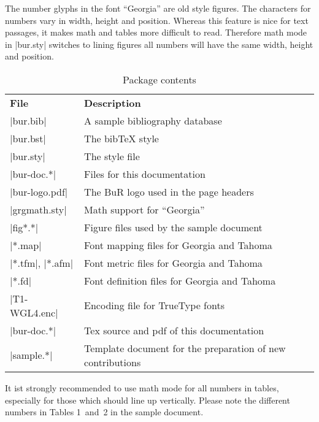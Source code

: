 \documentclass{article}
\begin{document}
  The number glyphs in the font ``Georgia'' are old style figures. The
  characters for numbers vary in width, height and position. Whereas this
  feature is nice for text passages, it makes math and tables more difficult
  to read. Therefore math mode in |bur.sty| switches to lining figures
  {\endash} all numbers will have the same width, height and position.

\begin{table}[t!]
\small
\caption{Package contents}\label{tab:1}
\noindent\begin{tabularx}{\columnwidth}{lX}
  \normalsize\textbf{File}&
  \normalsize\textbf{Description}\\[0.5mm]\bhline
  \rowcolor[gray]{0.9}
    |bur.bib|
      &A sample bibliography database\\\hline
    |bur.bst|
      &The bib\TeX{} style\\\hline
  \rowcolor[gray]{0.9}
    |bur.sty|
      &The style file\\\hline
    |bur-doc.*|
      &Files for this documentation\\\hline
  \rowcolor[gray]{0.9}
    |bur-logo.pdf|
      &The BuR logo used in the page headers\\\hline
    |grgmath.sty|
      &Math support for ``Georgia''\\\hline
  \rowcolor[gray]{0.9}
    |fig*.*|
      &Figure files used by the sample document\\\hline
    |*.map|
      &Font mapping files for Georgia and Tahoma\\\hline
  \rowcolor[gray]{0.9}
    |*.tfm|, |*.afm|
      &Font metric files for Georgia and Tahoma\\\hline
    |*.fd|
      &Font definition files for Georgia and Tahoma\\\hline
  \rowcolor[gray]{0.9}
    |T1-WGL4.enc|
      &Encoding file for TrueType fonts\\\hline
    |bur-doc.*|
      &Tex source and pdf of this documentation\\\hline
  \rowcolor[gray]{0.9}
    |sample.*|
      &Template document for the preparation of new contributions
\end{tabularx}
\end{table}

  It ist strongly recommended to use math mode for all numbers in tables,
  especially for those which should line up vertically. Please note the\vadjust{\vfil\break}
  different numbers in Tables 1~and~2 in the sample document.
\end{document}
